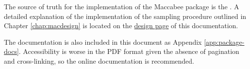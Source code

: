 \documentclass[../main.tex]{subfiles}
\begin{document}
The source of truth for the implementation of the Maccabee package is the . A detailed explanation of the implementation of the sampling procedure outlined in Chapter \ref{chap:macdesign} is located on the \href{\RTDurl/en/latest/design.html}{design page} of this documentation.

\vspace{\baselineskip}

The documentation is also included in this document as Appendix \ref{app:package-docs}. Accessibility is worse in the PDF format given the absence of pagination and cross-linking, so the online documentation is recommended.
\end{document}
